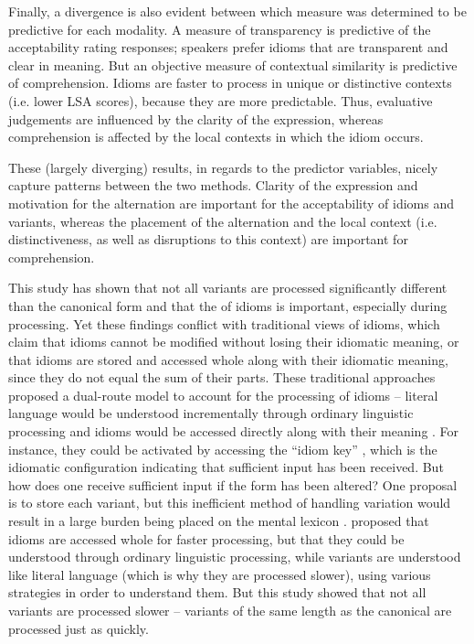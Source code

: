 \documentclass[output=paper,modfonts,nonflat]{langsci/langscibook}
\begin{document}
Finally, a divergence is also evident between which  measure was determined to be predictive for each modality. A measure of transparency is predictive of the acceptability rating responses; speakers prefer idioms that are transparent and clear in meaning. But an objective measure of contextual similarity is predictive of comprehension. Idioms are faster to process in unique or distinctive contexts (i.e. lower LSA scores), because they are more predictable. Thus, evaluative judgements are influenced by the clarity of the expression, whereas comprehension is affected by the local contexts in which the idiom occurs.

These (largely diverging) results,  in regards to the predictor variables, nicely capture patterns between the two methods. Clarity of the expression and motivation for the alternation are important for the acceptability of idioms and variants, whereas the placement of the alternation and the local context (i.e. distinctiveness, as well as disruptions to this context) are important for comprehension.

This study has shown that not all variants are processed significantly different than the canonical form and that the  of idioms is important, especially during processing. Yet these findings conflict with traditional views of idioms, which claim that idioms cannot be modified without losing their idiomatic meaning, or that idioms are stored and accessed whole along with their idiomatic meaning, since they do not equal the sum of their parts. These traditional approaches proposed a dual-route model to account for the processing of idioms -- literal language would be understood incrementally through ordinary linguistic processing and idioms would be accessed directly along with their meaning \citep[cf.][]{SwinneyCutler1979, CacciariTabossi1988}. For instance, they could be activated by accessing the ``idiom key'' \citep{CacciariTabossi1988}, which is the idiomatic configuration indicating that sufficient input has been received. But how does one receive sufficient input if the form has been altered? One proposal is to store each variant, but this inefficient method of handling variation would result in a large burden being placed on the mental lexicon \citep{BaayenEtAl2013}. \citet{McGloneEtAl1994} proposed that idioms are accessed whole for faster processing, but that they could be understood through ordinary linguistic processing, while variants are understood like literal language (which is why they are processed slower), using various strategies in order to understand them. But this study showed that not all variants are processed slower -- variants of the same length as the canonical are processed just as quickly.
\end{document}
